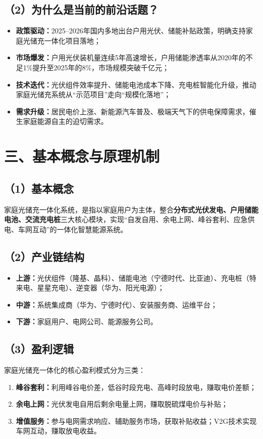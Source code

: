 \documentclass[12pt,a4paper,UTF8]{ctexart}
\begin{document}
\subsection*{（2）为什么是当前的前沿话题？}
\begin{itemize}
    \item \textbf{政策驱动：}2025--2026年国内多地出台户用光伏、储能补贴政策，明确支持家庭光储充一体化项目落地；
    \item \textbf{市场爆发：}户用光伏装机量连续5年高速增长，户用储能渗透率从2020年的不足1\%提升至2025年的8\%，市场规模突破千亿元；
    \item \textbf{技术迭代：}光伏组件效率提升、储能电池成本下降、充电桩智能化升级，推动家庭光储充系统从“示范项目”走向“规模化落地”；
    \item \textbf{需求升级：}居民电价上涨、新能源汽车普及、极端天气下的供电保障需求，催生家庭能源自主的迫切需求。
\end{itemize}

\section*{三、基本概念与原理机制}
\subsection*{（1）基本概念}
家庭光储充一体化系统，是指以家庭用户为主体，整合\textbf{分布式光伏发电、户用储能电池、交流充电桩}三大核心模块，实现“自发自用、余电上网、峰谷套利、应急供电、车网互动”的一体化智慧能源系统。

\subsection*{（2）产业链结构}
\begin{itemize}
    \item \textbf{上游：}光伏组件（隆基、晶科）、储能电池（宁德时代、比亚迪）、充电桩（特来电、星星充电）、逆变器（华为、阳光电源）；
    \item \textbf{中游：}系统集成商（华为、宁德时代）、安装服务商、运维平台；
    \item \textbf{下游：}家庭用户、电网公司、能源服务公司。
\end{itemize}

\subsection*{（3）盈利逻辑}
家庭光储充一体化的核心盈利模式分为三类：
\begin{enumerate}
    \item \textbf{峰谷套利：}利用峰谷电价差，低谷时段充电、高峰时段放电，赚取电价差额；
    \item \textbf{余电上网：}光伏发电自用后剩余电量上网，赚取脱硫煤电价与补贴；
    \item \textbf{增值服务：}参与电网需求响应、辅助服务市场，获取补贴收益；V2G技术实现车网互动，赚取放电收益。
\end{enumerate}
\end{document}
